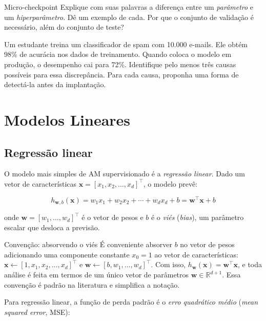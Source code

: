 \documentclass[12pt,a4paper]{article}
\begin{document}
\begin{checkpointbox}{Micro-checkpoint}
Explique com suas palavras a diferença entre um \emph{parâmetro} e um \emph{hiperparâmetro}. Dê um exemplo de cada. Por que o conjunto de validação é necessário, além do conjunto de teste?
\end{checkpointbox}

\begin{perguntabox}
Um estudante treina um classificador de spam com 10.000 e-mails. Ele obtém 98\% de acurácia nos dados de treinamento. Quando coloca o modelo em produção, o desempenho cai para 72\%. Identifique pelo menos três causas possíveis para essa discrepância. Para cada causa, proponha uma forma de detectá-la antes da implantação.
\end{perguntabox}

\section{Modelos Lineares}
\label{sec:lineares}

\subsection{Regressão linear}
\label{subsec:reg-linear}

O modelo mais simples de AM supervisionado é a \emph{regressão linear}. Dado um vetor de características $\mathbf{x} = [x_1, x_2, \ldots, x_d]^\top$, o modelo prevê:

\[
h_{\mathbf{w},b}(\mathbf{x}) = w_1 x_1 + w_2 x_2 + \cdots + w_d x_d + b = \mathbf{w}^\top \mathbf{x} + b
\]

onde $\mathbf{w} = [w_1, \ldots, w_d]^\top$ é o vetor de pesos e $b$ é o \emph{viés} (\textit{bias}), um parâmetro escalar que desloca a previsão.

\begin{notabox}{Convenção: absorvendo o viés}
É conveniente absorver $b$ no vetor de pesos adicionando uma componente constante $x_0 = 1$ ao vetor de características: $\mathbf{x} \leftarrow [1, x_1, x_2, \ldots, x_d]^\top$ e $\mathbf{w} \leftarrow [b, w_1, \ldots, w_d]^\top$. Com isso, $h_\mathbf{w}(\mathbf{x}) = \mathbf{w}^\top \mathbf{x}$, e toda análise é feita em termos de um único vetor de parâmetros $\mathbf{w} \in \mathbb{R}^{d+1}$. Essa convenção é padrão na literatura e simplifica a notação.
\end{notabox}

Para regressão linear, a função de perda padrão é o \emph{erro quadrático médio} (\textit{mean squared error}, MSE):
\end{document}
